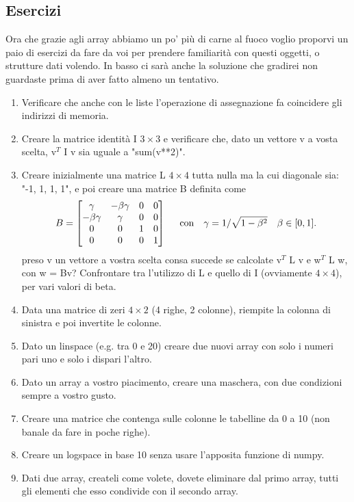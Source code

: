 \documentclass[10pt,a4paper]{article}
\begin{document}
\subsection{Esercizi}
Ora che grazie agli array abbiamo un po' più di carne al fuoco voglio proporvi un paio di esercizi da fare da voi per prendere familiarità con questi oggetti, o strutture dati volendo. In basso ci sarà anche la soluzione che gradirei non guardaste prima di aver fatto almeno un tentativo.
\\
\begin{enumerate}
\item Verificare che anche con le liste l'operazione di assegnazione fa coincidere gli indirizzi di memoria.
\item Creare la matrice identità I $3 \times 3$ e verificare che, dato un vettore v a vosta scelta, v$^{T}$ I v sia uguale a "sum(v**2)".
\item Creare inizialmente una matrice L $4 \times 4$ tutta nulla ma la cui diagonale sia: "-1, 1, 1, 1", e poi creare una matrice B definita come
\[
B = \begin{bmatrix}
\gamma&-\beta \gamma&0&0\\
-\beta \gamma&\gamma&0&0\\
0&0&1&0\\
0&0&0&1\\
\end{bmatrix}
\hspace{5 mm}
\text{con} \quad \gamma = 1/\sqrt{1-\beta^2} \quad \beta \in [0, 1] .
\]
preso v un vettore a vostra scelta consa succede se calcolate v$^{T}$ L v e w$^{T}$ L w, con w = Bv? Confrontare tra l'utilizzo di L e quello di I (ovviamente $4 \times 4$), per vari valori di beta.
\item Data una matrice di zeri $4 \times 2$ (4 righe, 2 colonne), riempite la colonna di sinistra e poi invertite le colonne.
\item Dato un linspace (e.g. tra 0 e 20) creare due nuovi array con solo i numeri pari uno e solo i dispari l'altro.
\item Dato un array a vostro piacimento, creare una maschera, con due condizioni sempre a vostro gusto. 
\item Creare una matrice che contenga sulle colonne le tabelline da 0 a 10 (non banale da fare in poche righe).
\item Creare un logspace in base 10 senza usare l'apposita funzione di numpy.
\item Dati due array, createli come volete, dovete eliminare dal primo array, tutti gli elementi che esso condivide con il secondo array.

\end{enumerate}
\end{document}
